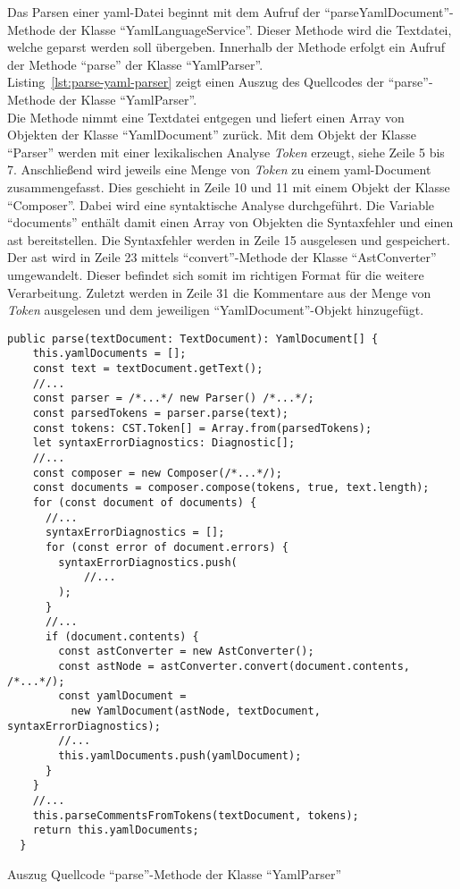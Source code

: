 Das Parsen einer \ac{yaml}-Datei beginnt mit dem Aufruf der ``parseYamlDocument''-Methode der Klasse ``YamlLanguageService''.
Dieser Methode wird die Textdatei, welche geparst werden soll übergeben. Innerhalb der Methode erfolgt ein Aufruf
der Methode ``parse'' der Klasse ``YamlParser''.
\\
Listing~\ref{lst:parse-yaml-parser} zeigt einen Auszug des Quellcodes der ``parse''-Methode der Klasse ``YamlParser''.
\\
Die Methode nimmt eine Textdatei entgegen und liefert einen Array von Objekten der Klasse ``YamlDocument'' zurück.
Mit dem Objekt der Klasse ``Parser'' werden mit einer lexikalischen Analyse \textit{Token} erzeugt, siehe Zeile 5 bis 7.
Anschließend wird jeweils eine Menge von \textit{Token} zu einem \ac{yaml}-Document zusammengefasst.
Dies geschieht in Zeile 10 und 11 mit einem Objekt der Klasse ``Composer''.
Dabei wird eine syntaktische Analyse durchgeführt. Die Variable ``documents'' enthält damit einen Array
von Objekten die Syntaxfehler und einen \ac{ast} bereitstellen.
Die Syntaxfehler werden in Zeile 15 ausgelesen und gespeichert.
Der \ac{ast} wird in Zeile 23 mittels ``convert''-Methode der Klasse ``AstConverter'' umgewandelt.
Dieser befindet sich somit im richtigen Format für die weitere Verarbeitung.
Zuletzt werden in Zeile 31 die Kommentare aus der Menge von \textit{Token} ausgelesen und dem jeweiligen ``YamlDocument''-Objekt hinzugefügt.

\begin{listing}[htp]
      \begin{verbatim}
public parse(textDocument: TextDocument): YamlDocument[] {
    this.yamlDocuments = [];
    const text = textDocument.getText();  
    //...
    const parser = /*...*/ new Parser() /*...*/;
    const parsedTokens = parser.parse(text);
    const tokens: CST.Token[] = Array.from(parsedTokens);
    let syntaxErrorDiagnostics: Diagnostic[];
    //...  
    const composer = new Composer(/*...*/);
    const documents = composer.compose(tokens, true, text.length);
    for (const document of documents) {
      //...
      syntaxErrorDiagnostics = [];
      for (const error of document.errors) {
        syntaxErrorDiagnostics.push(
            //...
        );
      }
      //...
      if (document.contents) {
        const astConverter = new AstConverter();
        const astNode = astConverter.convert(document.contents, /*...*/);
        const yamlDocument = 
          new YamlDocument(astNode, textDocument, syntaxErrorDiagnostics);
        //...   
        this.yamlDocuments.push(yamlDocument);
      }
    }
    //...          
    this.parseCommentsFromTokens(textDocument, tokens);
    return this.yamlDocuments;
  }
      \end{verbatim}
      \caption{Auszug Quellcode ``parse''-Methode der Klasse ``YamlParser''}
      \label{lst:parse-yaml-parser}
\end{listing}

